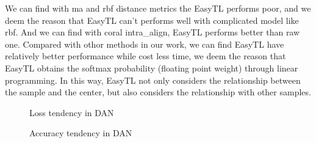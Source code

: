 \documentclass[conference]{IEEEtran}
\begin{document}
We can find with ma and rbf distance metrics the EasyTL performs poor, and we deem the reason that EasyTL can't performs well with complicated model like rbf. And we can find with coral intra\_align, EasyTL performs better than raw one. Compared with othor methods in our work, we can find EasyTL have relatively better performance while cost less time, we deem the reason that EasyTL obtains the softmax probability (floating point weight) through linear programming. In this way, EasyTL not only considers the relationship between the sample and the center, but also considers the relationship with other samples. 

\begin{center}
	\begin{figure}
		\centering
		\quad
		\quad
		\caption{Loss tendency in DAN}
		\label{kFig4}
	\end{figure}
\end{center}

\begin{center}
	\begin{figure}
		\centering
		\caption{Accuracy tendency in DAN}
		\label{kFig5}
	\end{figure}
\end{center}
\end{document}
